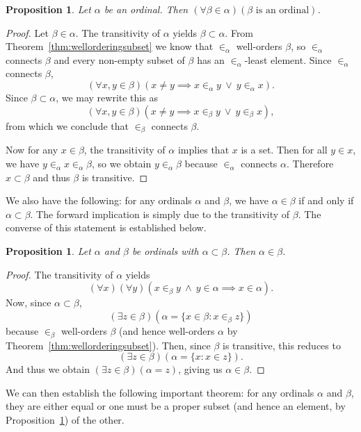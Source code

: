 \documentclass[a4paper,11pt]{article}
\theoremstyle{plain}
\newtheorem{prop}[thm]{Proposition}
\theoremstyle{definition}
\theoremstyle{remark}
\begin{document}
\begin{prop}
\label{prop:ElementsOfOrdinalsAreOrdinals}
Let $\alpha$ be an ordinal. Then $(\forall\beta\in\alpha)(\beta \text{ is an ordinal})$.
\end{prop}
\begin{proof}
Let $\beta\in\alpha$. The transitivity of $\alpha$ yields $\beta\subset\alpha$. From Theorem~\ref{thm:wellorderingsubset} we know that $\in_\alpha$ well-orders $\beta$, so $\in_\alpha$ connects $\beta$ and every non-empty subset of $\beta$ has an $\in_\alpha$-least element. Since $\in_\alpha$ connects $\beta$, 
\[(\forall x,y\in\beta)(x\neq y \implies x\in_\alpha y \ \lor \ y\in_\alpha x).\]
Since $\beta \subset \alpha$, we may rewrite this as
\[(\forall x,y\in\beta)(x\neq y \implies x\in_\beta y \ \lor \ y\in_\beta x),\]
from which we conclude that $\in_\beta$ connects $\beta$.

Now for any $x\in\beta$, the transitivity of $\alpha$ implies that $x$ is a set. Then for all $y \in x$, we have $y \in_\alpha x \in_\alpha \beta$, so we obtain $y\in_\alpha \beta$ because $\in_\alpha$ connects $\alpha$. Therefore $x\subset\beta$ and thus $\beta$ is transitive.
\end{proof}

We also have the following: for any ordinals $\alpha$ and $\beta$, we have $\alpha \in \beta$ if and only if $\alpha\subset\beta$. The forward implication is simply due to the transitivity of $\beta$. The converse of this statement is established below.

\begin{prop}
\label{prop:ordinalsubsetelement}
Let $\alpha$ and $\beta$ be ordinals with $\alpha\subset\beta$. Then $\alpha\in\beta$.
\end{prop}
\begin{proof}
The transitivity of $\alpha$ yields
\[(\forall x)(\forall y)(x\in_\beta y \ \land \ y\in\alpha \implies x\in\alpha).\]
Now, since $\alpha\subset\beta$,
\[(\exists z\in \beta)(\alpha = \{x\in\beta : x\in_\beta z\})\]
because $\in_\beta$ well-orders $\beta$ (and hence well-orders $\alpha$ by Theorem~\ref{thm:wellorderingsubset}). Then, since $\beta$ is transitive, this reduces to
\[(\exists z\in \beta)(\alpha = \{x : x\in z\}).\]
And thus we obtain $(\exists z\in\beta)(\alpha = z)$, giving us $\alpha\in\beta$.
\end{proof}

We can then establish the following important theorem: for any ordinals $\alpha$ and $\beta$, they are either equal or one must be a proper subset (and hence an element, by Proposition~\ref{prop:ordinalsubsetelement}) of the other.
\end{document}
